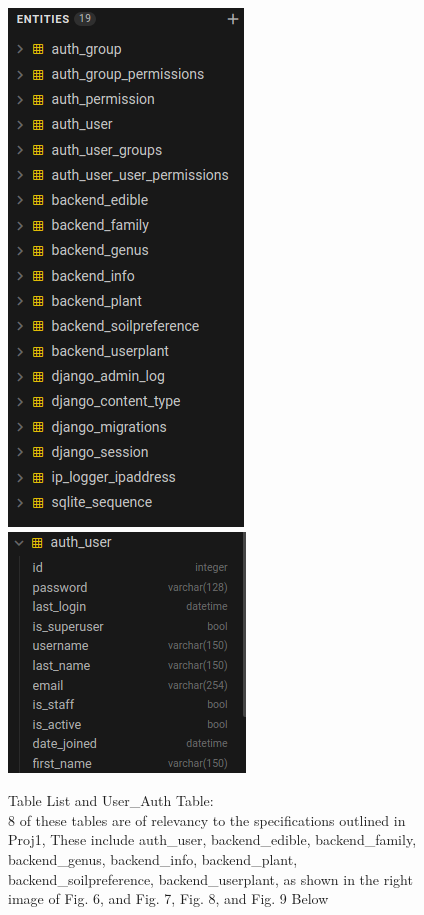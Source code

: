 \documentclass{article}
\begin{document}
        \begin{figure}[!htb]
            \centering
            \caption{Table List and User\_Auth Table: \\ 8 of these tables are of relevancy to the specifications outlined in Proj1, These include auth\_user, backend\_edible, backend\_family, backend\_genus, backend\_info, backend\_plant, backend\_soilpreference, backend\_userplant, as shown in the right image of Fig. 6, and Fig. 7, Fig. 8, and Fig. 9 Below}
            \includegraphics{sql1}
            \includegraphics{user}
        \end{figure}
\end{document}
